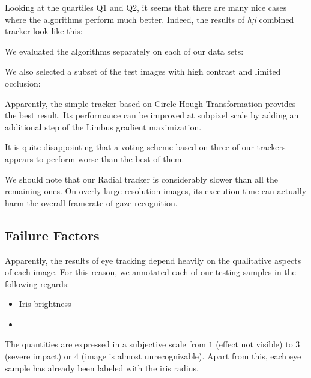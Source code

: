 Looking at the quartiles Q1 and Q2, it seems that there are many nice cases where the algorithms perform much better.
Indeed, the results of \textit{h;l} combined tracker look like this:\\

We evaluated the algorithms separately on each of our data sets:\\

We also selected a subset of the test images with high contrast and limited occlusion:\\

Apparently, the simple tracker based on Circle Hough Transformation provides the best result.
Its performance can be improved at subpixel scale by adding an additional step of the Limbus gradient maximization.

It is quite disappointing that a voting scheme based on three of our trackers appears to perform worse than the best of them.

We should note that our Radial tracker is considerably slower than all the remaining ones.
On overly large-resolution images, its execution time can actually harm the overall framerate of gaze recognition.

\subsection{Failure Factors}
\label{s:results-eyecovar}

Apparently, the results of eye tracking depend heavily on the qualitative aspects of each image.
For this reason, we annotated each of our testing samples in the following regards:
\begin{itemize}
\item Iris brightness
\item {}
\end{itemize}
The quantities are expressed in a subjective scale from $1$ (effect not visible) to $3$ (severe impact) or $4$ (image is almost unrecognizable).
Apart from this, each eye sample has already been labeled with the iris radius.

